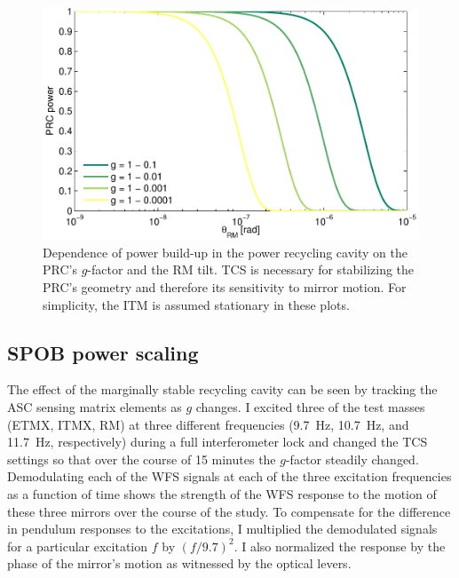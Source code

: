 \begin{figure}
\begin{centering}
\includegraphics[width=1.0\columnwidth]{figures/prc_power.pdf}
\caption{Dependence of power build-up in the power recycling cavity on
  the PRC's $g$-factor and the RM tilt. TCS is necessary for
  stabilizing the PRC's geometry and therefore its sensitivity to
  mirror motion. For simplicity, the ITM is assumed stationary in
  these plots.}
\label{fig:prc_power}
\end{centering}
\end{figure}


\subsection{SPOB power scaling}
The effect of the marginally stable recycling cavity can be seen by
tracking the ASC sensing matrix elements as $g$ changes. I excited
three of the test masses (ETMX, ITMX, RM) at three different
frequencies (9.7~Hz, 10.7~Hz, and 11.7~Hz, respectively) during a full
interferometer lock and changed the TCS settings so that over the
course of 15 minutes the $g$-factor steadily changed. Demodulating
each of the WFS signals at each of the three excitation frequencies as
a function of time shows the strength of the WFS response to the motion
of these three mirrors over the course of the study. To compensate for
the difference in pendulum responses to the excitations, I multiplied
the demodulated signals for a particular excitation $f$ by
$(f/9.7)^2$. I also normalized the response by the phase of the
mirror's motion as witnessed by the optical levers.

